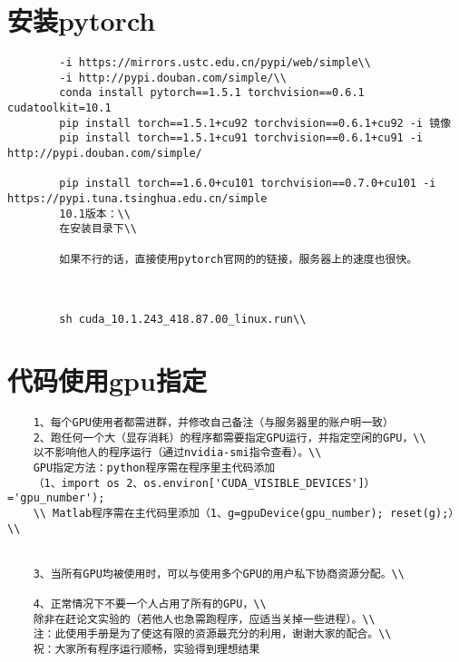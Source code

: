 \documentclass{ctexart}
\begin{document}
	\section{安装pytorch}
	\begin{lstlisting}
		-i https://mirrors.ustc.edu.cn/pypi/web/simple\\
		-i http://pypi.douban.com/simple/\\
		conda install pytorch==1.5.1 torchvision==0.6.1 cudatoolkit=10.1
		pip install torch==1.5.1+cu92 torchvision==0.6.1+cu92 -i 镜像
		pip install torch==1.5.1+cu91 torchvision==0.6.1+cu91 -i http://pypi.douban.com/simple/
		
		pip install torch==1.6.0+cu101 torchvision==0.7.0+cu101 -i https://pypi.tuna.tsinghua.edu.cn/simple
		10.1版本：\\
		在安装目录下\\
		
		如果不行的话，直接使用pytorch官网的的链接，服务器上的速度也很快。
		
		
		
		sh cuda_10.1.243_418.87.00_linux.run\\
	\end{lstlisting}
	
	
	\section{代码使用gpu指定}
	\begin{verbatim}
	1、每个GPU使用者都需进群，并修改自己备注（与服务器里的账户明一致）
	2、跑任何一个大（显存消耗）的程序都需要指定GPU运行，并指定空闲的GPU，\\
	以不影响他人的程序运行（通过nvidia-smi指令查看）。\\
	GPU指定方法：python程序需在程序里主代码添加
	（1、import os 2、os.environ['CUDA_VISIBLE_DEVICES']）='gpu_number');
	\\ Matlab程序需在主代码里添加（1、g=gpuDevice(gpu_number); reset(g);）\\
	
	
	3、当所有GPU均被使用时，可以与使用多个GPU的用户私下协商资源分配。\\
	
	4、正常情况下不要一个人占用了所有的GPU，\\
	除非在赶论文实验的（若他人也急需跑程序，应适当关掉一些进程）。\\
	注：此使用手册是为了使这有限的资源最充分的利用，谢谢大家的配合。\\
	祝：大家所有程序运行顺畅，实验得到理想结果
	\end{verbatim}
\end{document}
